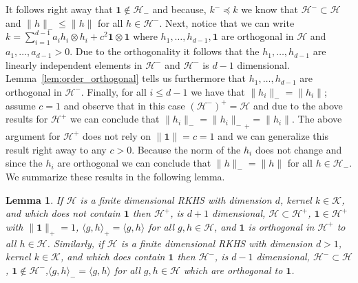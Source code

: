 \documentclass[10pt]{amsart}
\newtheorem{lemm}[theo]{Lemma}\newtheorem{prop}[theo]{Proposition}\newtheorem{coro}[theo]{Corollary}\newtheorem{conj}[theo]{Conjecture}
\theoremstyle{definition}\newtheorem{defi}[theo]{Definition}\newtheorem{rema}[theo]{Remark}\newtheorem{exam}[theo]{Example}\newtheorem{exem}[theo]{Example}\newtheorem{nota}[theo]{Notation}
\theoremstyle{remark}
\newcommand{\cH}{\mathcal{H}}
\newcommand{\clK}{\mathcal{K}}
\begin{document}
It follows right away that $\bm 1 \not \in \cH_-$ and because, $k^- \preceq k$ we know that $\cH^- \subset \cH$ and $\|h\|_- \leq \|h\|$ for all $h\in \cH^-$. Next, notice that we can write $k = \sum_{i=1}^{d-1} a_i h_i \otimes h_i + c^2 \bm 1 \otimes \bm 1$ where $h_1,\dots, h_{d-1}, \bm 1$ are orthogonal in $\cH$ and $a_1, \dots, a_{d-1} >0$. Due to the orthogonality it follows that the $h_1,\dots, h_{d-1}$ are linearly independent elements in $\cH^-$ and $\cH^-$ is $d-1$ dimensional. Lemma~\ref{lem:order_orthogonal} tells us furthermore that $h_1,\dots, h_{d-1}$ are orthogonal in $\cH^-$. Finally, for all $i\leq d-1$ we have that $\|h_i\|_- = \|h_i\|$; assume $c=1$ and observe that in this case $(\cH^-)^+ = \cH$ and due to the above results for $\cH^+$ we can conclude that $\|h_i\|_- = {\|h_i\|_-}_+ = \|h_i\|$. The above argument for $\cH^+$ does not rely on $\|\bm 1\| = c= 1$ and we can generalize this result right away to any $c >0$. Because the norm of the $h_i$ does not change and since the $h_i$ are orthogonal we can conclude that $\|h\|_- = \|h\|$ for all $h\in \cH_-$. We summarize these results in the following lemma.

\begin{lemm}\label{lem:approx_error_sup_finite}
If $\cH$ is a finite dimensional RKHS with dimension $d$, kernel $k \in \clK$, and which does not contain $\bm 1$ then $\cH^+$, is $d+1$ dimensional, $\cH \subset \cH^+$, $\bm 1 \in \cH^+$ with $\|\bm 1\|_+ = 1$, $\langle g,h \rangle_+ = \langle g,h \rangle$ for all $g,h \in \cH$, and $\bm 1$ is orthogonal in $\cH^+$ to all $h\in \cH$. Similarly, if $\cH$ is a finite dimensional RKHS with dimension $d > 1$, kernel $k\in \clK$, and which does contain $\bm 1$ then $\cH^-$, is $d-1$ dimensional, $\cH^- \subset \cH$, $\bm 1 \not \in \cH^-$,$\langle g,h \rangle_- = \langle g,h \rangle$ for all $g,h \in \cH$ which are orthogonal to $\bm 1$.
\end{lemm}
\end{document}
